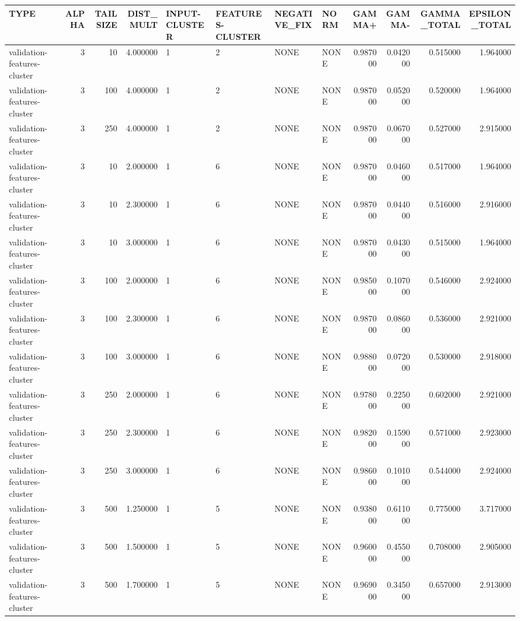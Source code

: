 \begin{tabular}{lrrrllllrrrr}
\toprule
TYPE & ALPHA & TAILSIZE & DIST_MULT & INPUT-CLUSTER & FEATURES-CLUSTER & NEGATIVE_FIX & NORM & GAMMA+ & GAMMA- & GAMMA_TOTAL & EPSILON_TOTAL \\
\midrule
validation-features-cluster & 3 & 10 & 4.000000 & 1 & 2 & NONE & NONE & 0.987000 & 0.042000 & 0.515000 & 1.964000 \\
validation-features-cluster & 3 & 100 & 4.000000 & 1 & 2 & NONE & NONE & 0.987000 & 0.052000 & 0.520000 & 1.964000 \\
validation-features-cluster & 3 & 250 & 4.000000 & 1 & 2 & NONE & NONE & 0.987000 & 0.067000 & 0.527000 & 2.915000 \\
validation-features-cluster & 3 & 10 & 2.000000 & 1 & 6 & NONE & NONE & 0.987000 & 0.046000 & 0.517000 & 1.964000 \\
validation-features-cluster & 3 & 10 & 2.300000 & 1 & 6 & NONE & NONE & 0.987000 & 0.044000 & 0.516000 & 2.916000 \\
validation-features-cluster & 3 & 10 & 3.000000 & 1 & 6 & NONE & NONE & 0.987000 & 0.043000 & 0.515000 & 1.964000 \\
validation-features-cluster & 3 & 100 & 2.000000 & 1 & 6 & NONE & NONE & 0.985000 & 0.107000 & 0.546000 & 2.924000 \\
validation-features-cluster & 3 & 100 & 2.300000 & 1 & 6 & NONE & NONE & 0.987000 & 0.086000 & 0.536000 & 2.921000 \\
validation-features-cluster & 3 & 100 & 3.000000 & 1 & 6 & NONE & NONE & 0.988000 & 0.072000 & 0.530000 & 2.918000 \\
validation-features-cluster & 3 & 250 & 2.000000 & 1 & 6 & NONE & NONE & 0.978000 & 0.225000 & 0.602000 & 2.921000 \\
validation-features-cluster & 3 & 250 & 2.300000 & 1 & 6 & NONE & NONE & 0.982000 & 0.159000 & 0.571000 & 2.923000 \\
validation-features-cluster & 3 & 250 & 3.000000 & 1 & 6 & NONE & NONE & 0.986000 & 0.101000 & 0.544000 & 2.924000 \\
validation-features-cluster & 3 & 500 & 1.250000 & 1 & 5 & NONE & NONE & 0.938000 & 0.611000 & 0.775000 & 3.717000 \\
validation-features-cluster & 3 & 500 & 1.500000 & 1 & 5 & NONE & NONE & 0.960000 & 0.455000 & 0.708000 & 2.905000 \\
validation-features-cluster & 3 & 500 & 1.700000 & 1 & 5 & NONE & NONE & 0.969000 & 0.345000 & 0.657000 & 2.913000 \\

\end{tabular}
